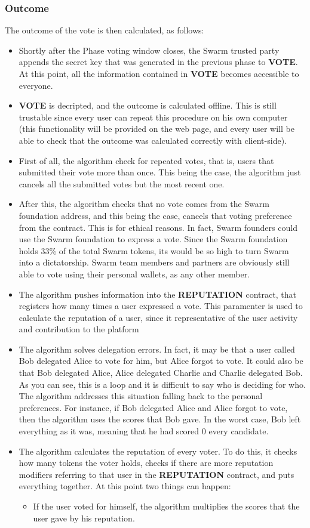 \documentclass[submission, copyright,creativecommons,sharealike,noncommercial]{eptcs}
\newcommand{\Vote}{\textbf{VOTE}\xspace}
\newcommand{\Reputation}{\textbf{REPUTATION}\xspace}
\begin{document}
\subsubsection{Outcome}\label{subsubsec:Intuitive Outcome}
%
		The outcome of the vote is then calculated, as follows:
		\begin{itemize}	
			\item Shortly after the Phase voting window closes, the Swarm trusted party appends the secret key that was generated in the previous phase to \Vote. At this point, all the information contained in \Vote becomes accessible to everyone.
			\item \Vote is decripted, and the outcome is calculated offline. This is still trustable since every user can repeat this procedure on his own computer (this functionality will be provided on the web page, and every user will be able to check that the outcome was calculated correctly with client-side).
			\item First of all, the algorithm check for repeated votes, that is, users that submitted their vote more than once. This being the case, the algorithm just cancels all the submitted votes but the most recent one.
			\item After this, the algorithm checks that no vote comes from the Swarm foundation address, and this being the case, cancels that voting preference from the contract. This is for ethical reasons. In fact, Swarm founders could use the Swarm foundation to express a vote. Since the Swarm foundation holds 33\% of the total Swarm tokens, its would be so high to turn Swarm into a dictatorship. Swarm team members and partners are obviously still able to vote using their personal wallets, as any other member.
			\item The algorithm pushes information into the \Reputation contract, that registers how many times a user expressed a vote. This paramenter is used to calculate the reputation of a user, since it representative of the user activity and contribution to the platform
			\item The algorithm solves delegation errors. In fact, it may be that a user called Bob delegated Alice to vote for him, but Alice forgot to vote. It could also be that Bob delegated Alice, Alice delegated Charlie and Charlie delegated Bob. As you can see, this is a loop and it is difficult to say who is deciding for who. The algorithm addresses this situation falling back to the personal preferences. For instance, if Bob delegated Alice and Alice forgot to vote, then the algorithm uses the scores that Bob gave. In the worst case, Bob left everything as it was, meaning that he had scored $0$ every candidate.
			\item The algorithm calculates the reputation of every voter. To do this, it checks how many tokens the voter holds, checks if there are more reputation modifiers referring to that user in the \Reputation contract, and puts everything together. At this point two things can happen:
			\begin{itemize}
				\item If the user voted for himself, the algorithm multiplies the scores that the user gave by his reputation.
				

\end{itemize}
\end{itemize}
\end{document}
